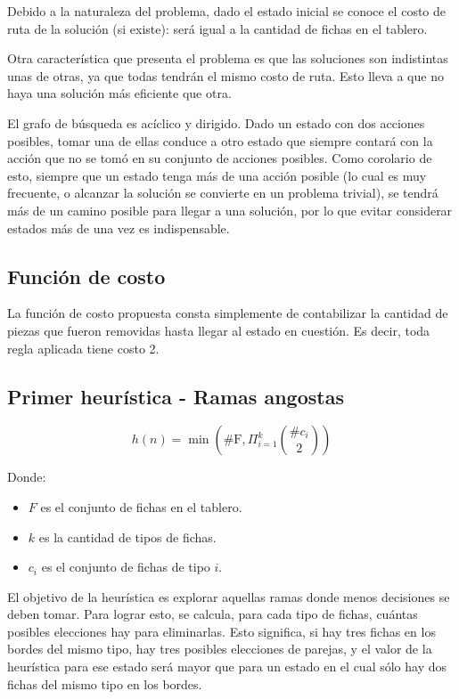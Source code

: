 \documentclass[a4paper,10pt]{article}
\begin{document}
    Debido a la naturaleza del problema, dado el estado inicial se conoce el costo de ruta de la solución (si existe): será igual a la cantidad de fichas en el tablero.

    Otra característica que presenta el problema es que las soluciones son indistintas unas de otras, ya que todas tendrán el mismo costo de ruta. Esto lleva a que no haya una solución más eficiente que otra.

    El grafo de búsqueda es acíclico y dirigido. Dado un estado con dos acciones posibles, tomar una de ellas conduce a otro estado que siempre contará con la acción que no se tomó en su conjunto de acciones posibles. Como corolario de esto, siempre que un estado tenga más de una acción posible (lo cual es muy frecuente, o alcanzar la solución se convierte en un problema trivial), se tendrá más de un camino posible para llegar a una solución, por lo que evitar considerar estados más de una vez es indispensable.

    \subsection{Función de costo}

    La función de costo propuesta consta simplemente de contabilizar la cantidad de piezas que fueron removidas hasta llegar al estado en cuestión. Es decir, toda regla aplicada 
    tiene costo 2. \\

    \subsection{Primer heurística - Ramas angostas}
    
    \[ h(n) = \min \left (\text{\# F}, \Pi_{i=1}^{k} {\# c_i \choose 2} \right )\] 

    Donde:
    \begin{itemize}
        \item $F$ es el conjunto de fichas en el tablero.
        \item $k$ es la cantidad de tipos de fichas.
        \item $c_i$ es el conjunto de fichas de tipo $i$.
    \end{itemize}

    El objetivo de la heurística es explorar aquellas ramas donde menos decisiones se deben tomar. Para lograr esto, se calcula, para cada tipo de fichas, cuántas posibles elecciones hay para eliminarlas. Esto significa, si hay tres fichas en los bordes del mismo tipo, hay tres posibles elecciones de parejas, y el valor de la heurística para ese estado será mayor que para un estado en el cual sólo hay dos fichas del mismo tipo en los bordes.
\end{document}
